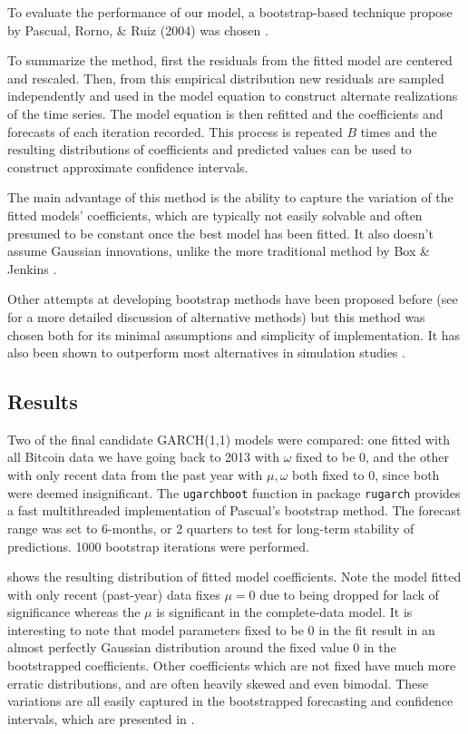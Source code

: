 \documentclass[12pt]{article}
\begin{document}
To evaluate the performance of our model, a bootstrap-based technique propose by Pascual, Rorno, \& Ruiz (2004) was chosen \cite{pascual}.

To summarize the method, first the residuals from the fitted model are centered and rescaled. Then, from this empirical distribution new residuals are sampled independently and used in the model equation to construct alternate realizations of the time series. The model equation is then refitted and the coefficients and forecasts of each iteration recorded. This process is repeated $B$ times and the resulting distributions of coefficients and predicted values can be used to construct approximate confidence intervals.

The main advantage of this method is the ability to capture the variation of the fitted models' coefficients, which are typically not easily solvable and often presumed to be constant once the best model has been fitted. It also doesn't assume Gaussian innovations, unlike the more traditional method by Box \& Jenkins \cite{box}.

Other attempts at developing bootstrap methods have been proposed before (see \cite{pascual} for a more detailed discussion of alternative methods) but this method was chosen both for its minimal assumptions and simplicity of implementation. It has also been shown to outperform most alternatives in simulation studies \cite{pascual}.

\subsection{Results}

Two of the final candidate GARCH(1,1) models were compared: one fitted with all Bitcoin data we have going back to 2013 with $\omega$ fixed to be $0$, and the other with only recent data from the past year with $\mu,\omega$ both fixed to $0$, since both were deemed insignificant. The \texttt{ugarchboot} function in package \texttt{rugarch} provides a fast multithreaded implementation of Pascual's bootstrap method. The forecast range was set to 6-months, or 2 quarters to test for long-term stability of predictions. 1000 bootstrap iterations were performed.

 shows the resulting  distribution of fitted model coefficients. Note the model fitted with only recent (past-year) data fixes $\mu=0$ due to being dropped for lack of significance whereas the $\mu$ is significant in the complete-data model. It is interesting to note that model parameters fixed to be $0$ in the fit result in an almost perfectly Gaussian distribution around the fixed value $0$ in the bootstrapped coefficients. Other coefficients which are not fixed have much more erratic distributions, and are often heavily skewed and even bimodal. These variations are all easily captured in the bootstrapped forecasting and confidence intervals, which are presented in .
\end{document}
